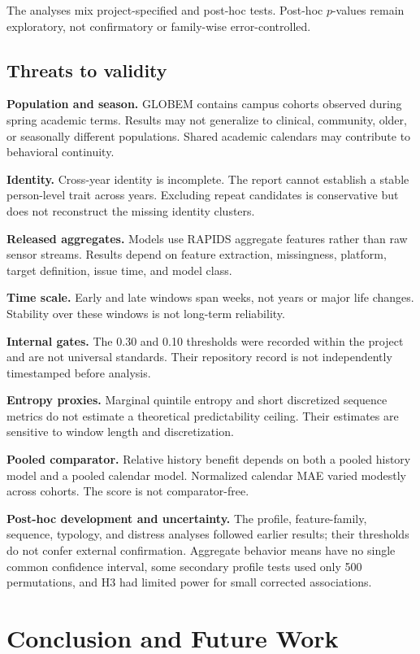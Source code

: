 \documentclass[a4paper,11pt,oneside]{report}
\begin{document}
The analyses mix project-specified and post-hoc tests. Post-hoc $p$-values remain
exploratory, not confirmatory or family-wise error-controlled.

\section{Threats to validity}

\textbf{Population and season.} GLOBEM contains campus cohorts observed during
spring academic terms. Results may not generalize to clinical, community, older, or
seasonally different populations. Shared academic calendars may contribute to
behavioral continuity.

\textbf{Identity.} Cross-year identity is incomplete. The report cannot establish a
stable person-level trait across years. Excluding repeat candidates is conservative
but does not reconstruct the missing identity clusters.

\textbf{Released aggregates.} Models use RAPIDS aggregate features rather than raw
sensor streams. Results depend on feature extraction, missingness, platform, target
definition, issue time, and model class.

\textbf{Time scale.} Early and late windows span weeks, not years or major life
changes. Stability over these windows is not long-term reliability.

\textbf{Internal gates.} The 0.30 and 0.10 thresholds were recorded within the
project and are not universal standards. Their repository record is not independently
timestamped before analysis.

\textbf{Entropy proxies.} Marginal quintile entropy and short discretized sequence
metrics do not estimate a theoretical predictability ceiling. Their estimates are
sensitive to window length and discretization.

\textbf{Pooled comparator.} Relative history benefit depends on both a pooled
history model and a pooled calendar model. Normalized calendar MAE varied modestly
across cohorts. The score is not comparator-free.

\textbf{Post-hoc development and uncertainty.} The profile, feature-family,
sequence, typology, and distress analyses followed earlier results; their thresholds
do not confer external confirmation. Aggregate behavior means have no single common
confidence interval, some secondary profile tests used only 500 permutations, and
H3 had limited power for small corrected associations.

\chapter{Conclusion and Future Work}
\label{ch:conclusion}
\end{document}
